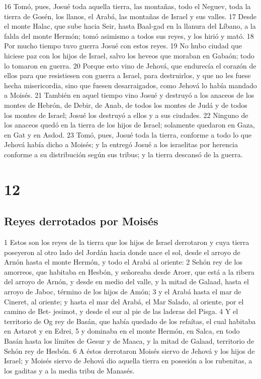 16 Tomó, pues, Josué toda aquella tierra, las montañas, todo el Neguev, toda la tierra de Gosén, los llanos, el Arabá, las montañas de Israel y sus valles.
17 Desde el monte Halac, que sube hacia Seir, hasta Baal-gad en la llanura del Líbano, a la falda del monte Hermón; tomó asimismo a todos sus reyes, y los hirió y mató.
18 Por mucho tiempo tuvo guerra Josué con estos reyes.
19 No hubo ciudad que hiciese paz con los hijos de Israel, salvo los heveos que moraban en Gabaón; todo lo tomaron en guerra.
20 Porque esto vino de Jehová, que endurecía el corazón de ellos para que resistiesen con guerra a Israel, para destruirlos, y que no les fuese hecha misericordia, sino que fuesen desarraigados, como Jehová lo había mandado a Moisés. 
21 También en aquel tiempo vino Josué y destruyó a los anaceos de los montes de Hebrón, de Debir, de Anab, de todos los montes de Judá y de todos los montes de Israel; Josué los destruyó a ellos y a sus ciudades.
22 Ninguno de los anaceos quedó en la tierra de los hijos de Israel; solamente quedaron en Gaza, en Gat y en Asdod.
23 Tomó, pues, Josué toda la tierra, conforme a todo lo que Jehová había dicho a Moisés; y la entregó Josué a los israelitas por herencia conforme a su distribución según sus tribus; y la tierra descansó de la guerra.

\chapter{12}

\section*{Reyes derrotados por Moisés}

1 Estos son los reyes de la tierra que los hijos de Israel derrotaron y cuya tierra poseyeron al otro lado del Jordán hacia donde nace el sol, desde el arroyo de Arnón hasta el monte Hermón, y todo el Arabá al oriente:
2 Sehón rey de los amorreos, que habitaba en Hesbón, y señoreaba desde Aroer, que está a la ribera del arroyo de Arnón, y desde en medio del valle, y la mitad de Galaad, hasta el arroyo de Jaboc, término de los hijos de Amón;
3 y el Arabá hasta el mar de Cineret, al oriente; y hasta el mar del Arabá, el Mar Salado, al oriente, por el camino de Bet- jesimot, y desde el sur al pie de las laderas del Pisga.
4 Y el territorio de Og rey de Basán, que había quedado de los refaítas, el cual habitaba en Astarot y en Edrei, 
5 y dominaba en el monte Hermón, en Salca, en todo Basán hasta los límites de Gesur y de Maaca, y la mitad de Galaad, territorio de Sehón rey de Hesbón. 
6 A éstos derrotaron Moisés siervo de Jehová y los hijos de Israel; y Moisés siervo de Jehová dio aquella tierra en posesión a los rubenitas, a los gaditas y a la media tribu de Manasés.

